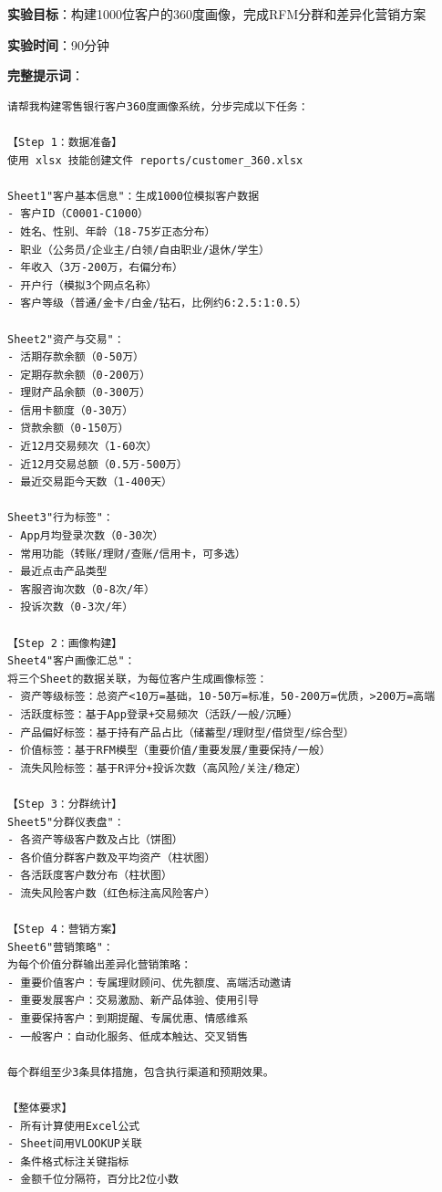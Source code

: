 \begin{exercisebox}

\textbf{实验目标}：构建1000位客户的360度画像，完成RFM分群和差异化营销方案

\textbf{实验时间}：90分钟

\textbf{完整提示词}：

\begin{lstlisting}
请帮我构建零售银行客户360度画像系统，分步完成以下任务：

【Step 1：数据准备】
使用 xlsx 技能创建文件 reports/customer_360.xlsx

Sheet1"客户基本信息"：生成1000位模拟客户数据
- 客户ID（C0001-C1000）
- 姓名、性别、年龄（18-75岁正态分布）
- 职业（公务员/企业主/白领/自由职业/退休/学生）
- 年收入（3万-200万，右偏分布）
- 开户行（模拟3个网点名称）
- 客户等级（普通/金卡/白金/钻石，比例约6:2.5:1:0.5）

Sheet2"资产与交易"：
- 活期存款余额（0-50万）
- 定期存款余额（0-200万）
- 理财产品余额（0-300万）
- 信用卡额度（0-30万）
- 贷款余额（0-150万）
- 近12月交易频次（1-60次）
- 近12月交易总额（0.5万-500万）
- 最近交易距今天数（1-400天）

Sheet3"行为标签"：
- App月均登录次数（0-30次）
- 常用功能（转账/理财/查账/信用卡，可多选）
- 最近点击产品类型
- 客服咨询次数（0-8次/年）
- 投诉次数（0-3次/年）

【Step 2：画像构建】
Sheet4"客户画像汇总"：
将三个Sheet的数据关联，为每位客户生成画像标签：
- 资产等级标签：总资产<10万=基础，10-50万=标准，50-200万=优质，>200万=高端
- 活跃度标签：基于App登录+交易频次（活跃/一般/沉睡）
- 产品偏好标签：基于持有产品占比（储蓄型/理财型/借贷型/综合型）
- 价值标签：基于RFM模型（重要价值/重要发展/重要保持/一般）
- 流失风险标签：基于R评分+投诉次数（高风险/关注/稳定）

【Step 3：分群统计】
Sheet5"分群仪表盘"：
- 各资产等级客户数及占比（饼图）
- 各价值分群客户数及平均资产（柱状图）
- 各活跃度客户数分布（柱状图）
- 流失风险客户数（红色标注高风险客户）

【Step 4：营销方案】
Sheet6"营销策略"：
为每个价值分群输出差异化营销策略：
- 重要价值客户：专属理财顾问、优先额度、高端活动邀请
- 重要发展客户：交易激励、新产品体验、使用引导
- 重要保持客户：到期提醒、专属优惠、情感维系
- 一般客户：自动化服务、低成本触达、交叉销售

每个群组至少3条具体措施，包含执行渠道和预期效果。

【整体要求】
- 所有计算使用Excel公式
- Sheet间用VLOOKUP关联
- 条件格式标注关键指标
- 金额千位分隔符，百分比2位小数
\end{lstlisting}


\end{exercisebox}
